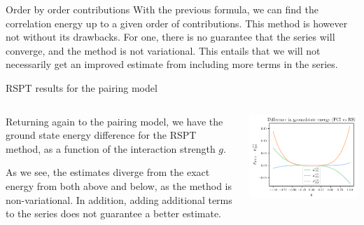 \documentclass[UKenglish,aspectratio=169]{beamer}
\begin{document}
\begin{frame}{Order by order contributions}
    With the previous formula, we can find the correlation energy up to a given order of contributions.
    This method is however not without its drawbacks.
    For one, there is no guarantee that the series will converge, and the method is not variational.
    This entails that we will not necessarily get an improved estimate from including more terms in the series.
\end{frame}

\begin{frame}{RSPT results for the pairing model}
    \begin{columns}
        \begin{column}{.49\textwidth}
            Returning again to the pairing model, we have the ground state energy difference for the RSPT method, as a function of the interaction strength $g$.

            \medskip

            As we see, the estimates diverge from the exact energy from both above and below, as the method is non-variational.
            In addition, adding additional terms to the series does not guarantee a better estimate.
        \end{column}

        \begin{column}{.49\textwidth}
            \includegraphics[width=\textwidth]{../midterm2/figures/rs_diff.pdf}
        \end{column}
    \end{columns}

\end{frame}
\end{document}
